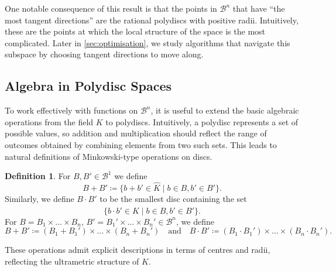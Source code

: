 \documentclass[10pt]{article}
\theoremstyle{definition}
\newtheorem{definition}[theorem]{Definition}
\begin{document}
One notable consequence of this result is that the points in $\mathcal B ^n$ that have ``the most tangent directions'' are the rational polydiscs with positive radii. Intuitively, these are the points at which the local structure of the space is the most complicated. 
Later in \cref{sec:optimisation}, we study algorithms that navigate this subspace by choosing tangent directions to move along.


\subsection{Algebra in Polydisc Spaces}

To work effectively with functions on $\mathcal B^n$, it is useful to extend the basic algebraic operations from the field $K$ to polydiscs. Intuitively, a polydisc represents a set of possible values, so addition and multiplication should reflect the range of outcomes obtained by combining elements from two such sets. This leads to natural definitions of Minkowski-type operations on discs.

\begin{definition}
  \label{def:algebra}
  For $B,B'\in\mathcal B^1$ we define
  \begin{equation*}
    B+B' \coloneqq \big\{ b+b'\in \hat K\mid b\in B, b'\in B' \big\}.
  \end{equation*}
  Similarly, we define $B\cdot B'$ to be the smallest disc containing the set
  $$
  \big\{ b\cdot b'\in \hat K\mid b\in B, b'\in B' \big\}.
  $$
  For $B=B_1\times\dots\times B_n$, $B'=B_1'\times\dots\times B_n'\in\mathcal B^n$, we define
  \begin{equation*}
    B+B'\coloneqq (B_1+B_1')\times\dots\times (B_n+B_n') \quad\text{and}\quad B\cdot B'\coloneqq (B_1\cdot B_1')\times\dots\times(B_n\cdot B_n').
  \end{equation*}
\end{definition}

These operations admit explicit descriptions in terms of centres and radii, reflecting the ultrametric structure of $K$.
\end{document}

